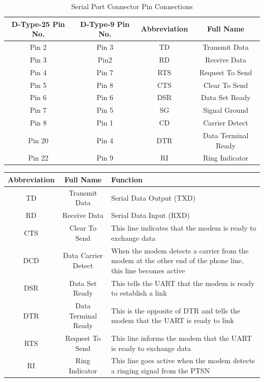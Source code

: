 \documentclass[a4paper,28pt]{report}
\begin{document}
\begin{table}[h]
\centering
\bgroup
\def\arraystretch{1.5}
\begin{tabular}{|c|c|c|c|}
\hline
\textbf{D-Type-25 Pin No.}  & \textbf{D-Type-9 Pin No.}  & \textbf{Abbreviation} & \textbf{Full Name}  \\ \hline
Pin 2 & Pin 3 & TD & Transmit Data \\ \hline
Pin 3 & Pin2  & RD & Receive Data\\ \hline
Pin 4 & Pin 7 & RTS & Request To Send     \\ \hline
Pin 5 & Pin 8 & CTS & Clear To Send       \\ \hline
Pin 6 & Pin 6 & DSR & Data Set Ready      \\ \hline
Pin 7 & Pin 5 & SG & Signal Ground       \\ \hline
Pin 8 & Pin 1 & CD & Carrier Detect      \\ \hline
Pin 20 & Pin 4 & DTR & Data Terminal Ready \\ \hline
Pin 22 & Pin 9 & RI&   Ring Indicator\\ \hline
\end{tabular}
\caption{Serial Port Connector Pin Connections}
\egroup
\end{table}
%
%
%
\newpage
\begin{table}[h]
\centering
\bgroup
\def\arraystretch{1.5}
\begin{tabular}{|c|c|p{7cm}|}
\hline
\textbf{Abbreviation} & \textbf{Full Name}  & \textbf{Function}\\
\hline
TD & Transmit Data & Serial Data Output (TXD)\\
\hline
RD  & Receive Data & Serial Data Input (RXD) \\
\hline
CTS & Clear To Send & This line indicates that the modem is ready to exchange data \\ \hline
DCD & Data Carrier Detect & When the modem detects a carrier from the modem at the other end of the phone line, this line becomes active \\
\hline
DSR & Data Set Ready & This tells the UART that the modem is ready to establish a link\\                                             \hline
DTR & Data Terminal Ready & This is the opposite of DTR and tells the modem that the UART is ready to link\\
\hline
RTS & Request To Send & This line informs the modem that the UART is ready to exchange data\\
\hline
RI & Ring Indicator & This line goes active when the modem detects a ringing signal from the PTSN\\
\hline
\end{tabular}
\egroup
\end{table}
%
\end{document}
